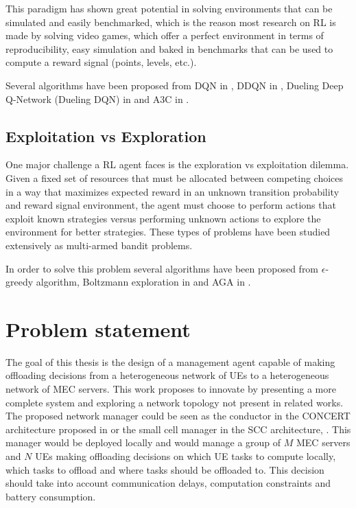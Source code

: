 \documentclass[conference]{IEEEtran}
\begin{document}
This paradigm has shown great potential in solving environments that can be simulated and easily benchmarked, which is the reason most research on \acrshort{RL} is made by solving video games, which offer a perfect environment in terms of reproducibility, easy simulation and baked in benchmarks that can be used to compute a reward signal (points, levels, etc.).

Several algorithms have been proposed from \acrfull{DQN} in \cite{DQN}, \acrfull{DDQN} in \cite{doubleDQN}, Dueling Deep Q-Network (Dueling DQN) in \cite{duelingDQN} and \acrfull{A3C} in \cite{a3c}.

\subsection{Exploitation vs Exploration} \label{section:EE}
\noindent One major challenge a \acrshort{RL} agent faces is the exploration vs exploitation dilemma. Given a fixed set of resources that must be allocated between competing choices in a way that maximizes expected reward in an unknown transition probability and reward signal environment, the agent must choose to perform actions that exploit known strategies versus performing unknown actions to explore the environment for better strategies. These types of problems have been studied extensively as multi-armed bandit problems.

In order to solve this problem several algorithms have been proposed from $\epsilon$-greedy algorithm, Boltzmann exploration in \cite{boltz} and \acrfull{AGA} in \cite{AGAcrypto}.

\section{Problem statement}

\noindent The goal of this thesis is the design of a management agent capable of making offloading decisions from a heterogeneous network of \acrshort{UE}s to a heterogeneous network of \acrshort{MEC} servers. This work proposes to innovate by presenting a more complete system and exploring a network topology not present in related works. The proposed network manager could be seen as the conductor in the CONCERT architecture proposed in \cite{CONCERT} or the small cell manager in the \acrshort{SCC} architecture, \cite{SESAM}. This manager would be deployed locally and would manage a group of $M$ \acrshort{MEC} servers and $N$ \acrshort{UE}s making offloading decisions on which \acrshort{UE} tasks to compute locally, which tasks to offload and where tasks should be offloaded to. This decision should take into account communication delays, computation constraints and battery consumption.
\end{document}
